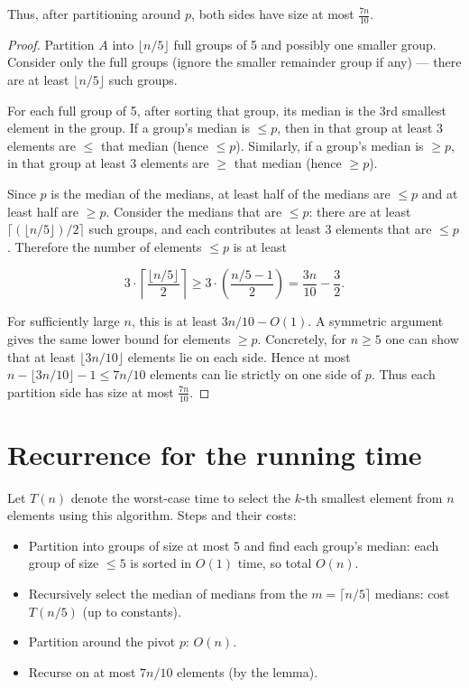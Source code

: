 \documentclass[11pt]{article}
\begin{document}
Thus, after partitioning around \(p\), both sides have size at most \(\tfrac{7n}{10}\).

\begin{proof}
Partition \(A\) into $\lfloor n/5\rfloor$ full groups of 5 and possibly one smaller group. Consider only the full groups (ignore the smaller remainder group if any) — there are at least $\lfloor n/5\rfloor$ such groups.

For each full group of 5, after sorting that group, its median is the 3rd smallest element in the group. If a group's median is $\le p$, then in that group at least 3 elements are $\le$ that median (hence $\le p$). Similarly, if a group's median is $\ge p$, in that group at least 3 elements are $\ge$ that median (hence $\ge p$).

Since $p$ is the median of the medians, at least half of the medians are $\le p$ and at least half are $\ge p$. Consider the medians that are $\le p$: there are at least $\lceil (\lfloor n/5\rfloor)/2\rceil$ such groups, and each contributes at least 3 elements that are $\le p$. Therefore the number of elements $\le p$ is at least

\[
3\cdot \left\lceil\frac{\lfloor n/5\rfloor}{2}\right\rceil \ge 3\cdot\left(\frac{n/5 - 1}{2}\right) = \frac{3n}{10} - \frac{3}{2}.
\]

For sufficiently large \(n\), this is at least \(3n/10 - O(1)\). A symmetric argument gives the same lower bound for elements $\ge p$. Concretely, for $n\ge 5$ one can show that at least $\lfloor 3n/10\rfloor$ elements lie on each side. Hence at most $n - \lfloor 3n/10\rfloor - 1 \le 7n/10$ elements can lie strictly on one side of $p$. Thus each partition side has size at most $\tfrac{7n}{10}$.
\end{proof}

\section*{Recurrence for the running time}
Let \(T(n)\) denote the worst-case time to select the \(k\)-th smallest element from \(n\) elements using this algorithm. Steps and their costs:

\begin{itemize}
  \item Partition into groups of size at most 5 and find each group's median: each group of size $\le 5$ is sorted in $O(1)$ time, so total $O(n)$.
  \item Recursively select the median of medians from the $m=\lceil n/5\rceil$ medians: cost $T(n/5)$ (up to constants).
  \item Partition around the pivot $p$: $O(n)$.
  \item Recurse on at most $7n/10$ elements (by the lemma).
\end{itemize}
\end{document}
